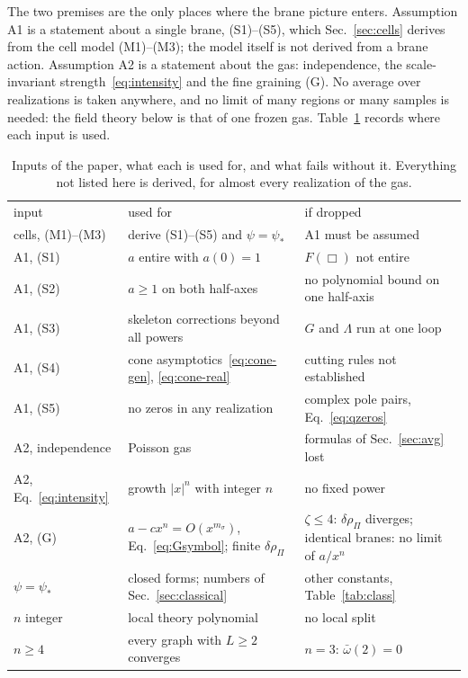 \documentclass[aps,prd,10pt,twocolumn,superscriptaddress,nofootinbib,floatfix,longbibliography]{revtex4-2}
\begin{document}
The two premises are the only places where the brane picture enters. Assumption A1 is a statement about a single brane, (S1)--(S5), which Sec.~\ref{sec:cells} derives from the cell model (M1)--(M3); the model itself is not derived from a brane action. Assumption A2 is a statement about the gas: independence, the scale-invariant strength~\eqref{eq:intensity} and the fine graining (G). No average over realizations is taken anywhere, and no limit of many regions or many samples is needed: the field theory below is that of one frozen gas. Table~\ref{tab:assumptions} records where each input is used.

\begin{table}[t]
\caption{Inputs of the paper, what each is used for, and what fails without it. Everything not listed here is derived, for almost every realization of the gas.}
\label{tab:assumptions}
\begin{ruledtabular}
\begin{tabular}{p{1.95cm}p{3.05cm}p{2.9cm}}
input & used for & if dropped\\
\colrule
cells, (M1)--(M3) & derive (S1)--(S5) and $\psi=\psi_*$ & A1 must be assumed\\
A1, (S1) & $a$ entire with $a(0)=1$ & $F(\Box)$ not entire\\
A1, (S2) & $a\ge1$ on both half-axes & no polynomial bound on one half-axis\\
A1, (S3) & skeleton corrections beyond all powers & $G$ and $\Lambda$ run at one loop\\
A1, (S4) & cone asymptotics~\eqref{eq:cone-gen}, \eqref{eq:cone-real} & cutting rules not established\\
A1, (S5) & no zeros in any realization & complex pole pairs, Eq.~\eqref{eq:qzeros}\\
A2, independence & Poisson gas & formulas of Sec.~\ref{sec:avg} lost\\
A2, Eq.~\eqref{eq:intensity} & growth $|x|^n$ with integer $n$ & no fixed power\\
A2, (G) & $a-cx^n=O(x^{m_\sigma})$, Eq.~\eqref{eq:Gsymbol}; finite $\delta\rho_\Pi$ & $\zeta\le4$: $\delta\rho_\Pi$ diverges; identical branes: no limit of $a/x^n$\\
$\psi=\psi_*$ & closed forms; numbers of Sec.~\ref{sec:classical} & other constants, Table~\ref{tab:class}\\
$n$ integer & local theory polynomial & no local split\\
$n\ge4$ & every graph with $L\ge2$ converges & $n=3$: $\bar\omega(2)=0$\\
\end{tabular}
\end{ruledtabular}
\end{table}
\end{document}
